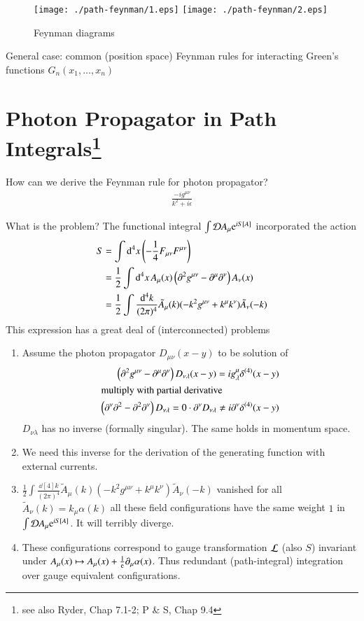 \begin{figure}[ht]
   \centering
   \texttt{[image: ./path-feynman/1.eps]}%
   \texttt{[image: ./path-feynman/2.eps]}
   \caption{Feynman diagrams}
\end{figure}

General case: common (position space) Feynman rules for interacting Green's functions $G_n (x_1, \dots, x_n)$

\section[Photon Propagator in Path Integrals]{Photon Propagator in Path Integrals\footnote{see also Ryder, Chap 7.1-2; P \& S, Chap 9.4}}
How can we derive the Feynman rule for photon propagator?
\begin{align}
   \frac{-ig^{\mu\nu}}{k^2 + i \epsilon}
\end{align}

What is the problem? The functional integral $\int \mathcal{D} A_\mu \mathrm{e}^{iS[A]}$ incorporated the action
\begin{align}
   S &= \int \dd[4]{x} \left( - \frac{1}{4} F_{\mu\nu} F^{\mu\nu} \right) \notag\\ 
     &= \frac{1}{2} \int \dd[4]{x} A_\mu(x) \left( \partial^2 g^{\mu\nu} - \partial^{\mu} \partial^\nu \right) A_\nu(x) \notag\\
     &= \frac{1}{2} \int \frac{\dd[4]{k}}{(2\pi)^4} \tilde{A}_\mu (k) (-k^2 g^{\mu\nu} + k^\mu k^\nu) \tilde{A}_\nu (-k) 
\end{align}
This expression has a great deal of (interconnected) problems
\begin{enumerate}
   \item Assume the photon propagator $D_{\mu\nu} (x-y)$ to be solution of
         \begin{align*}
            \left( \partial^2 g^{\mu\nu} - \partial^\mu \partial^\nu \right)D_{\nu\lambda} (x-y) = i g^\mu_\lambda \delta^{(4)}(x-y) \\
            \shortintertext{multiply with partial derivative}
            \left( \partial^\nu \partial^2 - \partial^2 \partial^\nu \right) D_{\nu\lambda} = 0 \cdot \partial^\nu D_{\nu\lambda} \neq i \partial^\nu \delta^{(4)} (x-y)
         \end{align*}
         $D_{\nu\lambda}$ has no inverse (formally singular). The same holds in momentum space.
      \item We need this inverse for the derivation of the generating function with external currents.
      \item $\frac{1}{2} \int \frac{\dd[4]{k}}{(2\pi)^4} \tilde{A}_\mu (k) (-k^2 g^{\mu\nu} + k^\mu k^\nu) \tilde{A}_\nu (-k)$ vanished for all $\tilde{A}_\nu(k) = k_\mu \alpha(k)$
         all these field configurations have the same weight $1$ in $\int \mathcal{D} A_\mu \mathrm{e}^{iS[A]}$. It will terribly diverge. 
      \item These configurations correspond to gauge transformation $\mathcal{L}$ (also $S$) invariant under $A_\mu(x) \mapsto A_\mu(x) + \frac{1}{\mathrm{e}} \partial_\mu \alpha(x) $. 
         Thus redundant (path-integral) integration over gauge equivalent configurations.
\end{enumerate}

